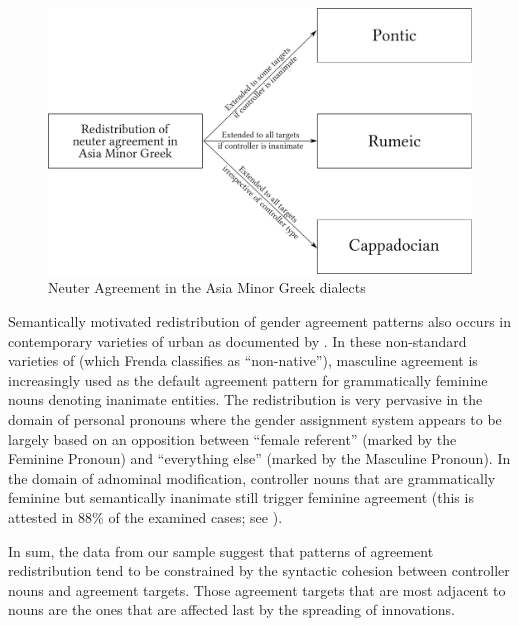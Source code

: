 \documentclass[output=collectionpaper]{langsci/langscibook}
\begin{document}
\begin{figure}
\includegraphics[height=.4\textheight]{figures/11/AMGa}
\caption{Neuter Agreement in the Asia Minor Greek dialects}
\label{fig:dgm:AMG}
\end{figure}

Semantically motivated redistribution of gender agreement patterns also occurs in contemporary varieties of urban  as documented by \citet{Frenda2011}. In these non-standard varieties of  (which Frenda classifies as ``non-native''), masculine agreement is increasingly used as the default agreement pattern for grammatically feminine nouns denoting inanimate entities. The redistribution is very pervasive in the domain of personal pronouns where the gender assignment system appears to be largely based on an opposition between ``female referent'' (marked by the Feminine Pronoun) and ``everything else'' (marked by the Masculine Pronoun). In the domain of adnominal modification,  controller nouns that are grammatically feminine but semantically inanimate still trigger feminine agreement (this is attested in 88\% of the examined cases; see \citealt[17, Figure 1]{Frenda2011}).

In sum, the data from our sample suggest that patterns of agreement redistribution tend to be constrained by the syntactic cohesion between controller nouns and agreement targets. Those agreement targets that are most adjacent to nouns are the ones that are affected last by the spreading of innovations.
\end{document}

